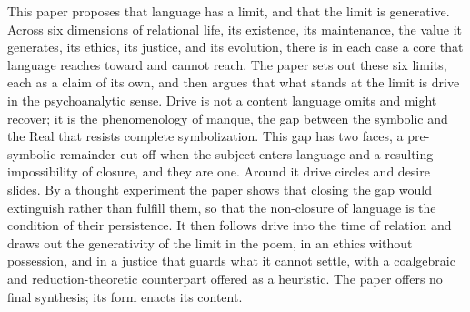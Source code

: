 This paper proposes that language has a limit, and that the limit is generative. Across six dimensions of relational life, its existence, its maintenance, the value it generates, its ethics, its justice, and its evolution, there is in each case a core that language reaches toward and cannot reach. The paper sets out these six limits, each as a claim of its own, and then argues that what stands at the limit is drive in the psychoanalytic sense. Drive is not a content language omits and might recover; it is the phenomenology of manque, the gap between the symbolic and the Real that resists complete symbolization. This gap has two faces, a pre-symbolic remainder cut off when the subject enters language and a resulting impossibility of closure, and they are one. Around it drive circles and desire slides. By a thought experiment the paper shows that closing the gap would extinguish rather than fulfill them, so that the non-closure of language is the condition of their persistence. It then follows drive into the time of relation and draws out the generativity of the limit in the poem, in an ethics without possession, and in a justice that guards what it cannot settle, with a coalgebraic and reduction-theoretic counterpart offered as a heuristic. The paper offers no final synthesis; its form enacts its content.
